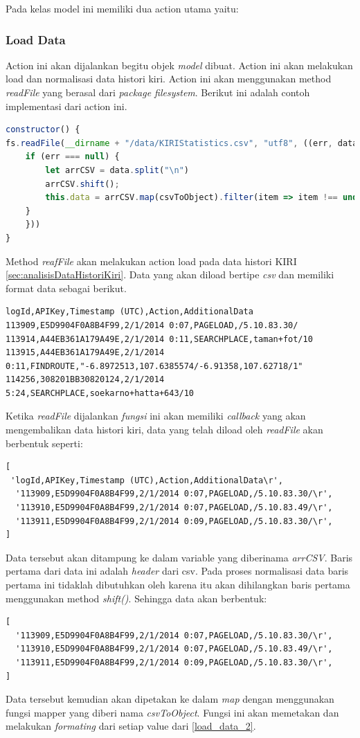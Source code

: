 Pada kelas model ini memiliki dua action utama yaitu:
\subsubsection{Load Data}
Action ini akan dijalankan begitu objek \textit{model} dibuat. Action ini akan melakukan load dan normalisasi data histori kiri. Action ini akan menggunakan method \textit{readFile} yang berasal dari \textit{package filesystem}. Berikut ini adalah contoh implementasi dari action ini.


\begin{lstlisting}[label=Kiri_Model, language=JavaScript, caption=Metode Load Data, breaklines]
constructor() {
fs.readFile(__dirname + "/data/KIRIStatistics.csv", "utf8", ((err, data) => {
    if (err === null) {
        let arrCSV = data.split("\n")
        arrCSV.shift();
        this.data = arrCSV.map(csvToObject).filter(item => item !== undefined);
    }
    }))
}
\end{lstlisting}


Method \textit{reafFile} akan melakukan action load pada data histori KIRI \ref{sec:analisisDataHistoriKiri}. Data yang akan diload bertipe \textit{csv} dan memiliki format data sebagai berikut.
\begin{lstlisting}[label=Kiri_Histori_Data, caption=Histori Data KIRI]
logId,APIKey,Timestamp (UTC),Action,AdditionalData
113909,E5D9904F0A8B4F99,2/1/2014 0:07,PAGELOAD,/5.10.83.30/
113914,A44EB361A179A49E,2/1/2014 0:11,SEARCHPLACE,taman+fot/10
113915,A44EB361A179A49E,2/1/2014 0:11,FINDROUTE,"-6.8972513,107.6385574/-6.91358,107.62718/1"
114256,308201BB30820124,2/1/2014 5:24,SEARCHPLACE,soekarno+hatta+643/10
\end{lstlisting}
Ketika \textit{readFile} dijalankan \textit{fungsi} ini akan memiliki \textit{callback} yang akan mengembalikan data histori kiri, data yang telah diload oleh \textit{readFile} akan berbentuk seperti: 
\begin{lstlisting}[label=load_data_1 , caption=Raw Data]
[
 'logId,APIKey,Timestamp (UTC),Action,AdditionalData\r',
  '113909,E5D9904F0A8B4F99,2/1/2014 0:07,PAGELOAD,/5.10.83.30/\r',
  '113910,E5D9904F0A8B4F99,2/1/2014 0:07,PAGELOAD,/5.10.83.49/\r',
  '113911,E5D9904F0A8B4F99,2/1/2014 0:09,PAGELOAD,/5.10.83.30/\r',
]
\end{lstlisting}
Data tersebut akan ditampung ke dalam variable yang diberinama \textit{arrCSV}. Baris pertama dari data ini adalah \textit{header} dari csv. Pada proses normalisasi data baris pertama ini tidaklah dibutuhkan oleh karena itu akan dihilangkan baris pertama menggunakan method \textit{shift()}. Sehingga data akan berbentuk:
\begin{lstlisting}[label=load_data_2 , caption=Raw Data 2]
[
  '113909,E5D9904F0A8B4F99,2/1/2014 0:07,PAGELOAD,/5.10.83.30/\r',
  '113910,E5D9904F0A8B4F99,2/1/2014 0:07,PAGELOAD,/5.10.83.49/\r',
  '113911,E5D9904F0A8B4F99,2/1/2014 0:09,PAGELOAD,/5.10.83.30/\r',
]
\end{lstlisting}
Data tersebut kemudian akan dipetakan ke dalam \textit{map} dengan menggunakan fungsi mapper yang diberi nama \textit{csvToObject}. Fungsi ini akan memetakan dan melakukan \textit{formating} dari setiap value dari \ref{load_data_2}.

